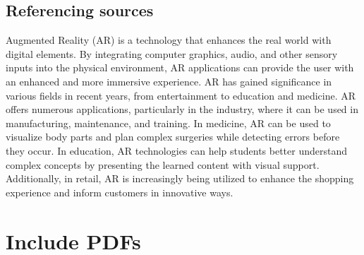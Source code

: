 \subsection{Referencing sources}
Augmented Reality (AR) is a technology that enhances the real world with digital elements.
By integrating computer graphics, audio, and other sensory inputs into the physical environment, AR applications can provide the user with an enhanced and more immersive experience.
AR has gained significance in various fields in recent years, from entertainment to education and medicine.
AR offers numerous applications, particularly in the industry, where it can be used in manufacturing, maintenance, and training.
In medicine, AR can be used to visualize body parts and plan complex surgeries while detecting errors before they occur.
In education, AR technologies can help students better understand complex concepts by presenting the learned content with visual support.
Additionally, in retail, AR is increasingly being utilized to enhance the shopping experience and inform customers in innovative ways. \cite[S. 1-6]{computers11020028}

\newpage
\section{Include PDFs}

